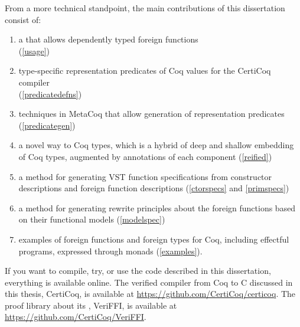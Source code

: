 From a more technical standpoint, the main contributions of this dissertation consist of:
\begin{enumerate}
\item a \ffi{} that allows dependently typed \gls{foreign function}s\\ (\autoref{usage})
\item type-specific representation predicates of Coq values for the CertiCoq compiler \\(\autoref{predicatedefns})
\item techniques in MetaCoq that allow generation of representation predicates (\autoref{predicategen})
\item a novel way to  Coq types, which is a hybrid of deep and shallow embedding of Coq types, augmented by annotations of each component (\autoref{reified})
\item a method for generating VST function specifications from constructor descriptions and \gls{foreign function} descriptions (\autoref{ctorspecs} and \autoref{primspecs})
\item a method for generating rewrite principles about the \gls{foreign function}s based on their \gls{functional model}s (\autoref{modelspec})
\item examples of \gls{foreign function}s and \gls{foreign type}s for Coq, including effectful programs, expressed through monads (\autoref{examples}).
\end{enumerate}

If you want to compile, try, or use the code described in this dissertation, everything is available online. The verified compiler from Coq to C discussed in this thesis, CertiCoq, is available at \url{https://github.com/CertiCoq/certicoq}. The proof library about its \ffi{}, VeriFFI, is available at \url{https://github.com/CertiCoq/VeriFFI}.


